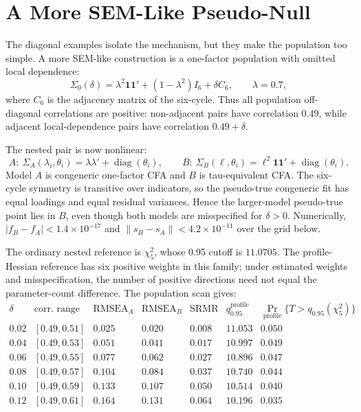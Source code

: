 \documentclass[11pt]{article}
\begin{document}
\section{A More SEM-Like Pseudo-Null}

The diagonal examples isolate the mechanism, but they make the population too
simple. A more SEM-like construction is a one-factor population with omitted
local dependence:
\[
  \Sigma_0(\delta)
  = \lambda^2 \mathbf 1\mathbf 1'
    + (1-\lambda^2)I_6
    + \delta C_6,
  \qquad \lambda=0.7,
\]
where \(C_6\) is the adjacency matrix of the six-cycle. Thus all population
off-diagonal correlations are positive: non-adjacent pairs have correlation
\(0.49\), while adjacent local-dependence pairs have correlation
\(0.49+\delta\).

The nested pair is now nonlinear:
\[
  A:\ \Sigma_A(\lambda_i,\theta_i)=\lambda\lambda' + \operatorname{diag}(\theta_i),
  \qquad
  B:\ \Sigma_B(\ell,\theta_i)=\ell^2\mathbf 1\mathbf 1'
    + \operatorname{diag}(\theta_i).
\]
Model \(A\) is congeneric one-factor CFA and \(B\) is tau-equivalent CFA. The
six-cycle symmetry is transitive over indicators, so the pseudo-true congeneric
fit has equal loadings and equal residual variances. Hence the larger-model
pseudo-true point lies in \(B\), even though both models are misspecified for
\(\delta>0\). Numerically, \(\lvert f_B-f_A\rvert<1.4\times10^{-17}\) and
\(\lVert s_B-s_A\rVert<4.2\times10^{-11}\) over the grid below.

The ordinary nested reference is \(\chi^2_5\), whose 0.95 cutoff is \(11.0705\).
The profile-Hessian reference has six positive weights in this family; under
estimated weights and misspecification, the number of positive directions need
not equal the parameter-count difference. The population scan gives:
\[
\begin{array}{c|c|ccc|cc}
\delta & \text{corr. range} & \text{RMSEA}_A & \text{RMSEA}_B & \text{SRMR}
& q^{\mathrm{profile}}_{0.95}
& \Pr_{\mathrm{profile}}\{T>q_{0.95}(\chi^2_5)\}\\
\hline
0.02 & [0.49,0.51] & 0.025 & 0.020 & 0.008 & 11.053 & 0.050\\
0.04 & [0.49,0.53] & 0.051 & 0.041 & 0.017 & 10.997 & 0.049\\
0.06 & [0.49,0.55] & 0.077 & 0.062 & 0.027 & 10.896 & 0.047\\
0.08 & [0.49,0.57] & 0.104 & 0.084 & 0.037 & 10.740 & 0.044\\
0.10 & [0.49,0.59] & 0.133 & 0.107 & 0.050 & 10.514 & 0.040\\
0.12 & [0.49,0.61] & 0.164 & 0.131 & 0.064 & 10.196 & 0.035
\end{array}
\]
\end{document}
